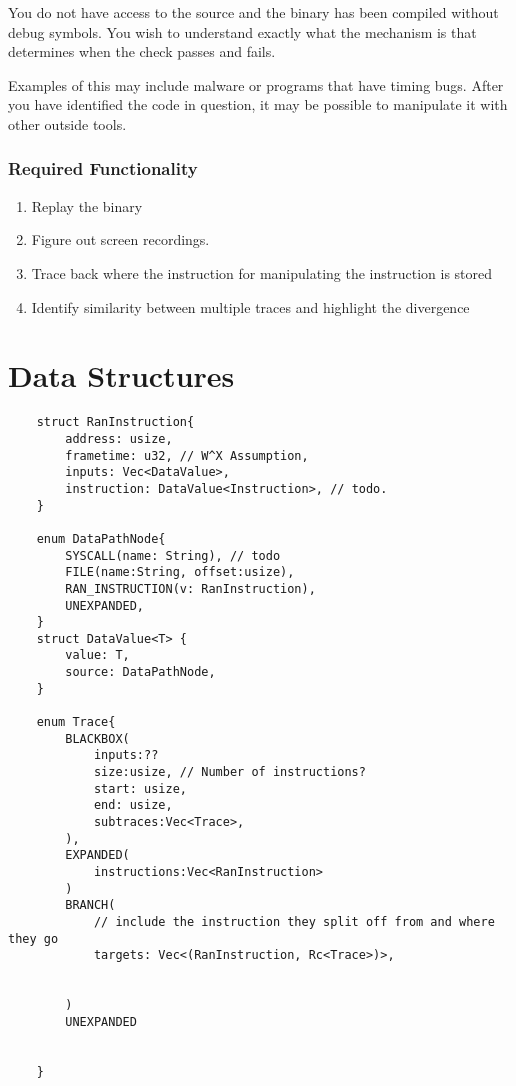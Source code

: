 You do not have access to the source and the binary has been compiled without debug symbols. You wish to understand exactly what the mechanism is that determines when the check passes and fails. 

Examples of this may include malware or programs that have timing bugs. After you have identified the code in question, it may be possible to manipulate it with other outside tools. 


\subsubsection{Required Functionality}
\begin{enumerate}
    \item Replay the binary 
    \item Figure out screen recordings.
    \item Trace back where the instruction for manipulating the instruction is stored
    \item Identify similarity between multiple traces and highlight the divergence

\end{enumerate}




\section{Data Structures}
\begin{verbatim}
    struct RanInstruction{
        address: usize,
        frametime: u32, // W^X Assumption,
        inputs: Vec<DataValue>,
        instruction: DataValue<Instruction>, // todo. 
    }

    enum DataPathNode{
        SYSCALL(name: String), // todo
        FILE(name:String, offset:usize),
        RAN_INSTRUCTION(v: RanInstruction),
        UNEXPANDED,
    }
    struct DataValue<T> {
        value: T, 
        source: DataPathNode,
    }

    enum Trace{
        BLACKBOX(
            inputs:??
            size:usize, // Number of instructions?
            start: usize,
            end: usize,
            subtraces:Vec<Trace>,
        ),
        EXPANDED(
            instructions:Vec<RanInstruction>
        )
        BRANCH(
            // include the instruction they split off from and where they go
            targets: Vec<(RanInstruction, Rc<Trace>)>,


        )
        UNEXPANDED


    }

\end{verbatim}




